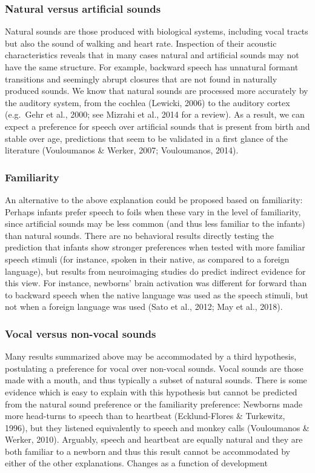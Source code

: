 \documentclass[man]{apa6}
\begin{document}
\subsubsection{Natural versus artificial
sounds}\label{natural-versus-artificial-sounds}

Natural sounds are those produced with biological systems, including
vocal tracts but also the sound of walking and heart rate. Inspection of
their acoustic characteristics reveals that in many cases natural and
artificial sounds may not have the same structure. For example, backward
speech has unnatural formant transitions and seemingly abrupt closures
that are not found in naturally produced sounds. We know that natural
sounds are processed more accurately by the auditory system, from the
cochlea (Lewicki, 2006) to the auditory cortex (e.g.~Gehr et al., 2000;
see Mizrahi et al., 2014 for a review). As a result, we can expect a
preference for speech over artificial sounds that is present from birth
and stable over age, predictions that seem to be validated in a first
glance of the literature (Vouloumanos \& Werker, 2007; Vouloumanos,
2014).

\subsubsection{Familiarity}\label{familiarity}

An alternative to the above explanation could be proposed based on
familiarity: Perhaps infants prefer speech to foils when these vary in
the level of familiarity, since artificial sounds may be less common
(and thus less familiar to the infants) than natural sounds. There are
no behavioral results directly testing the prediction that infants show
stronger preferences when tested with more familiar speech stimuli (for
instance, spoken in their native, as compared to a foreign language),
but results from neuroimaging studies do predict indirect evidence for
this view. For instance, newborns' brain activation was different for
forward than to backward speech when the native language was used as the
speech stimuli, but not when a foreign language was used (Sato et al.,
2012; May et al., 2018).

\subsubsection{Vocal versus non-vocal
sounds}\label{vocal-versus-non-vocal-sounds}

Many results summarized above may be accommodated by a third hypothesis,
postulating a preference for vocal over non-vocal sounds. Vocal sounds
are those made with a mouth, and thus typically a subset of natural
sounds. There is some evidence which is easy to explain with this
hypothesis but cannot be predicted from the natural sound preference or
the familiarity preference: Newborns made more head-turns to speech than
to heartbeat (Ecklund-Flores \& Turkewitz, 1996), but they listened
equivalently to speech and monkey calls (Vouloumanos \& Werker, 2010).
Arguably, speech and heartbeat are equally natural and they are both
familiar to a newborn and thus this result cannot be accommodated by
either of the other explanations. Changes as a function of development
\end{document}
